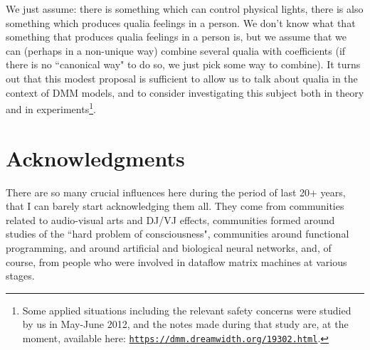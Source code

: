 \documentclass{article}
\begin{document}
We just assume: there is something which can control physical lights, there is also something
which produces qualia feelings in a person. We don't know what that something that
produces qualia feelings in a person is, but we assume that we can (perhaps in a non-unique way)
combine several qualia with coefficients (if there is no ``canonical way" to do so, we just pick some
way to combine). It turns out that this modest proposal is sufficient to allow us to talk about qualia
in the context of DMM models, and to consider investigating this subject both in theory
and in experiments\footnote{Some applied situations
including the relevant safety concerns were studied by us in May-June 2012, and the notes made
during that study are, at the moment, available here: \href{https://dmm.dreamwidth.org/19302.html}{\tt https://dmm.dreamwidth.org/19302.html}.}.

\section*{Acknowledgments} 

There are so many crucial influences here during the period of last 20+ years, that I can
barely start acknowledging them all. They come from communities related to audio-visual arts
and DJ/VJ effects, communities formed around studies of the ``hard problem of consciousness", 
communities around functional programming, and around artificial and biological neural networks,
and, of course, from people who were involved in dataflow matrix machines at various stages.









\end{document}
